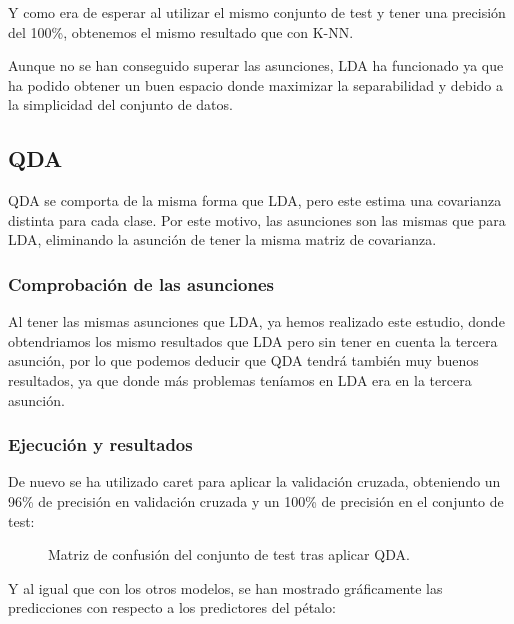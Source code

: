 \begin{figure}[H]
	\centering
	
	\label{fig:predicciones_lda}
\end{figure}

Y como era de esperar al utilizar el mismo conjunto de test y tener una precisión del 100\%, obtenemos el mismo resultado que con K-NN.

Aunque no se han conseguido superar las asunciones, LDA ha funcionado ya que ha podido obtener un buen espacio donde maximizar la separabilidad y debido a la simplicidad del conjunto de datos.

\subsection{QDA}

QDA se comporta de la misma forma que LDA, pero este estima una covarianza distinta para cada clase. Por este motivo, las asunciones son las mismas que para LDA, eliminando la asunción de tener la misma matriz de covarianza.

\subsubsection{Comprobación de las asunciones}

Al tener las mismas asunciones que LDA, ya hemos realizado este estudio, donde obtendriamos los mismo resultados que LDA pero sin tener en cuenta la tercera asunción, por lo que podemos deducir que QDA tendrá también muy buenos resultados, ya que donde más problemas teníamos en LDA era en la tercera asunción.

\subsubsection{Ejecución y resultados}

De nuevo se ha utilizado caret para aplicar la validación cruzada, obteniendo un 96\% de precisión en validación cruzada y un 100\% de precisión en el conjunto de test:


\begin{figure}[H]
	\centering
	
	\caption{Matriz de confusión del conjunto de test tras aplicar QDA.}
	\label{fig:matriz_confusion_qda}
\end{figure}


Y al igual que con los otros modelos, se han mostrado gráficamente las predicciones con respecto a los predictores del pétalo:

